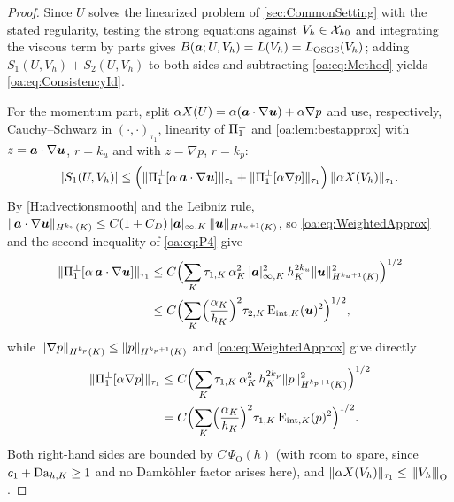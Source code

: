 \begin{proof}
Since $U$ solves the linearized problem of \cref{sec:CommonSetting} with the stated regularity, testing the
strong equations against $V_h \in \mathcal{X}_{h0}$ and integrating the viscous term by parts
gives $B(\boldsymbol{a}; U, V_h) = L(V_h) = L_{\mathrm{OSGS}}(V_h)$; adding $S_1(U,V_h) + S_2(U,V_h)$ to both sides and
subtracting \cref{oa:eq:Method} yields \cref{oa:eq:ConsistencyId}.

For the momentum part, split $\alpha X(U) = \alpha(\boldsymbol{a}\cdot\nabla\boldsymbol{u}) + \alpha\nabla p$
and use, respectively, Cauchy--Schwarz in $(\cdot,\cdot)_{\tau_1}$, linearity of
$\Pi_{1}^{\perp}$ and \cref{oa:lem:bestapprox} with $z = \boldsymbol{a}\cdot\nabla\boldsymbol{u}$, $r = k_u$ and with
$z = \nabla p$, $r = k_p$:
\[
  |S_1(U, V_h)|
  \le \Bigl( \lVert \Pi_{1}^{\perp}[\alpha\,\boldsymbol{a}\cdot\nabla\boldsymbol{u}] \rVert_{\tau_1}
  + \lVert \Pi_{1}^{\perp}[\alpha\nabla p] \rVert_{\tau_1} \Bigr)\,\lVert \alpha X(V_h) \rVert_{\tau_1}.
\]
By \cref{H:advectionsmooth} and the Leibniz rule,
$\lVert \boldsymbol{a}\cdot\nabla\boldsymbol{u} \rVert_{H^{k_u}(K)} \le C(1+C_D)\,|\boldsymbol{a}|_{\infty,K}\,
\lVert \boldsymbol{u} \rVert_{H^{k_u+1}(K)}$, so \cref{oa:eq:WeightedApprox} and the second inequality of
\cref{oa:eq:P4} give
\[
\begin{aligned}
  \lVert \Pi_{1}^{\perp}[\alpha\,\boldsymbol{a}\cdot\nabla\boldsymbol{u}] \rVert_{\tau_1}
  &\le C \Bigl( \sum_K \tau_{1,K}\,\alpha_K^2\,|\boldsymbol{a}|_{\infty,K}^2\, h_K^{2k_u}
  \lVert \boldsymbol{u} \rVert_{H^{k_u+1}(K)}^2 \Bigr)^{1/2} \\
  &\le C \Bigl( \sum_K \Bigl(\frac{\alpha_K}{h_K}\Bigr)^{2} \tau_{2,K}\,
  \mathrm{E}_{\mathrm{int},K}(\boldsymbol{u})^2 \Bigr)^{1/2},
\end{aligned}
\]
while $\lVert \nabla p \rVert_{H^{k_p}(K)} \le \lVert p \rVert_{H^{k_p+1}(K)}$ and
\cref{oa:eq:WeightedApprox} give directly
\[
\begin{aligned}
  \lVert \Pi_{1}^{\perp}[\alpha\nabla p] \rVert_{\tau_1}
  &\le C \Bigl( \sum_K \tau_{1,K}\,\alpha_K^2\, h_K^{2k_p}
  \lVert p \rVert_{H^{k_p+1}(K)}^2 \Bigr)^{1/2} \\
  &= C \Bigl( \sum_K \Bigl(\frac{\alpha_K}{h_K}\Bigr)^{2} \tau_{1,K}\,
  \mathrm{E}_{\mathrm{int},K}(p)^2 \Bigr)^{1/2}.
\end{aligned}
\]
Both right-hand sides are bounded by $C\,\Psi_{\mathrm O}(h)$ (with room to spare, since
$c_1+\mathrm{Da}_{h,K} \ge 1$ and no Damk\"ohler factor arises here), and
$\lVert \alpha X(V_h) \rVert_{\tau_1} \le {\lvert\kern-0.25ex\lvert\kern-0.25ex\lvert V_h \rvert\kern-0.25ex\rvert\kern-0.25ex\rvert}_{\mathrm{O}}$.


\end{proof}
